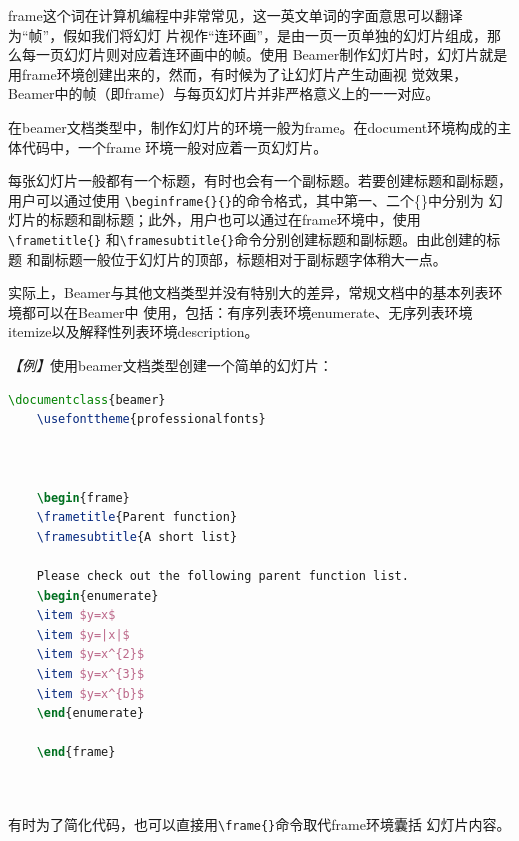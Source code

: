 frame这个词在计算机编程中非常常见，这一英文单词的字面意思可以翻译为“帧”，假如我们将幻灯
片视作“连环画”，是由一页一页单独的幻灯片组成，那么每一页幻灯片则对应着连环画中的帧。使用
Beamer制作幻灯片时，幻灯片就是用frame环境创建出来的，然而，有时候为了让幻灯片产生动画视
觉效果，Beamer中的帧（即frame）与每页幻灯片并非严格意义上的一一对应。

在beamer文档类型中，制作幻灯片的环境一般为frame。在document环境构成的主体代码中，一个frame
环境一般对应着一页幻灯片。

每张幻灯片一般都有一个标题，有时也会有一个副标题。若要创建标题和副标题，用户可以通过使用
\texttt{\textbackslash{}begin{frame}\{\}\{\}}的命令格式，其中第一、二个\{\}中分别为
幻灯片的标题和副标题；此外，用户也可以通过在frame环境中，使用\texttt{\textbackslash{}frametitle\{\}}
和\texttt{\textbackslash{}framesubtitle\{\}}命令分别创建标题和副标题。由此创建的标题
和副标题一般位于幻灯片的顶部，标题相对于副标题字体稍大一点。

实际上，Beamer与其他文档类型并没有特别大的差异，常规文档中的基本列表环境都可以在Beamer中
使用，包括：有序列表环境enumerate、无序列表环境itemize以及解释性列表环境description。

\emph{【例】}使用beamer文档类型创建一个简单的幻灯片：
\begin{lstlisting}[language=TeX]
    \documentclass{beamer}
    \usefonttheme{professionalfonts}

    

    \begin{frame}
    \frametitle{Parent function}
    \framesubtitle{A short list}

    Please check out the following parent function list.
    \begin{enumerate}
    \item $y=x$
    \item $y=|x|$
    \item $y=x^{2}$
    \item $y=x^{3}$
    \item $y=x^{b}$
    \end{enumerate}

    \end{frame}

    
\end{lstlisting}

有时为了简化代码，也可以直接用\texttt{\textbackslash{}frame\{\}}命令取代frame环境囊括
幻灯片内容。

